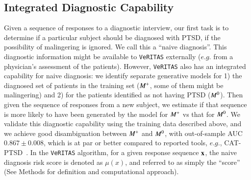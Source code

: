 \documentclass[onecolumn,10pt]{IEEEtran}
\def\Methods{Online Methods}
\def\Methods{Methods\xspace}
\def\vrts{\texttt{VeRITAS}\xspace}
\begin{document}
\subsection*{Integrated Diagnostic Capability}
Given a sequence of responses to a diagnostic interview, our first task is to determine if a particular subject should be diagnosed with PTSD,  if the  possibility of  malingering is ignored. We call this a ``naive diagnosis''. This diagnostic information might be available to \vrts externally ($e.g.$ from a physician's assessment of the patients). However, \vrts also has an integrated capability for naive diagnosis: we identify separate  generative models for 1) the diagnosed set of patients in the training set ($M^+$, some of them might be malingering) and 2) for the patients identified as not having PTSD ($M^0$). Then given the sequence of responses from a new subject, we estimate if that sequence is more likely to have been generated by the model for  $M^+$ vs that for $M^0$. We validate this diagnostic capability  using the training data described above, and we achieve good disambiguation between $M^+$ and $M^0$, with out-of-sample AUC  {\color{Red1}$0.867\pm 0.008$}, which is at par or better compared to reported tools, $e.g.$,  CAT-PTSD~\cite{Brenner_2021}. In the \vrts algorithm, for a given response sequence $\bm{\mathrm{x}}$, the naive diagnosis risk score is denoted as $\mu(x)$, and referred to as simply the ``score'' (See \Methods for definition and computational approach).

\end{document}
